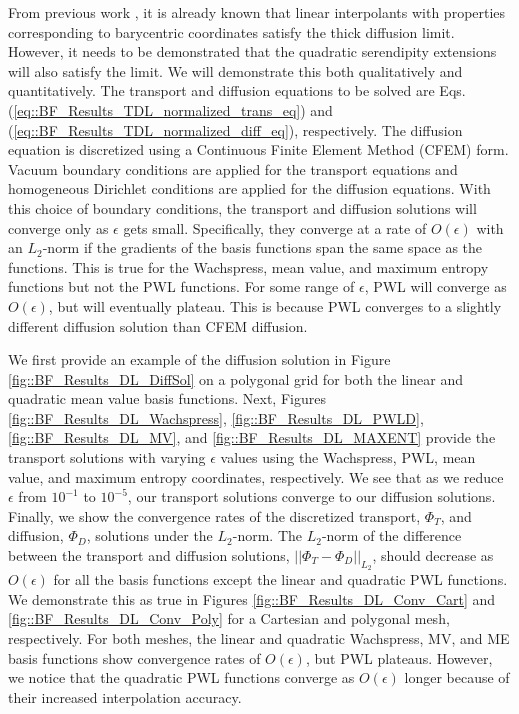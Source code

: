 From previous work \cite{adams2001dfem}, it is already known that linear interpolants with properties corresponding to barycentric coordinates satisfy the thick diffusion limit. However, it needs to be demonstrated that the quadratic serendipity extensions will also satisfy the limit. We will demonstrate this both qualitatively and quantitatively. The transport and diffusion equations to be solved are Eqs. (\ref{eq::BF_Results_TDL_normalized_trans_eq}) and (\ref{eq::BF_Results_TDL_normalized_diff_eq}), respectively. The diffusion equation is discretized using a Continuous Finite Element Method (CFEM) form. Vacuum boundary conditions are applied for the transport equations and homogeneous Dirichlet conditions are applied for the diffusion equations. With this choice of boundary conditions, the transport and diffusion solutions will converge only as $\epsilon$ gets small. Specifically, they converge at a rate of $O(\epsilon)$ with an $L_2$-norm if the gradients of the basis functions span the same space as the functions. This is true for the Wachspress, mean value, and maximum entropy functions but not the PWL functions. For some range of $\epsilon$, PWL will converge as $O(\epsilon)$, but will eventually plateau. This is because PWL converges to a slightly different diffusion solution than CFEM diffusion.

We first provide an example of the diffusion solution in Figure \ref{fig::BF_Results_DL_DiffSol} on a polygonal grid for both the linear and quadratic mean value basis functions. Next, Figures \ref{fig::BF_Results_DL_Wachspress}, \ref{fig::BF_Results_DL_PWLD}, \ref{fig::BF_Results_DL_MV}, and \ref{fig::BF_Results_DL_MAXENT} provide the transport solutions with varying $\epsilon$ values using the Wachspress, PWL, mean value, and maximum entropy coordinates, respectively. We see that as we reduce $\epsilon$ from $10^{-1}$ to $10^{-5}$, our transport solutions converge to our diffusion solutions. Finally, we show the convergence rates of the discretized transport, $\Phi_T$, and diffusion, $\Phi_D$, solutions under the $L_2$-norm. The $L_2$-norm of the difference between the transport and diffusion solutions, $|| \Phi_T - \Phi_D||_{L_2}$, should decrease as $O(\epsilon)$ for all the basis functions except the linear and quadratic PWL functions. We demonstrate this as true in Figures \ref{fig::BF_Results_DL_Conv_Cart} and \ref{fig::BF_Results_DL_Conv_Poly} for a Cartesian and polygonal mesh, respectively. For both meshes, the linear and quadratic Wachspress, MV, and ME basis functions show convergence rates of $O(\epsilon)$, but PWL plateaus. However, we notice that the quadratic PWL functions converge as $O(\epsilon)$ longer because of their increased interpolation accuracy.

